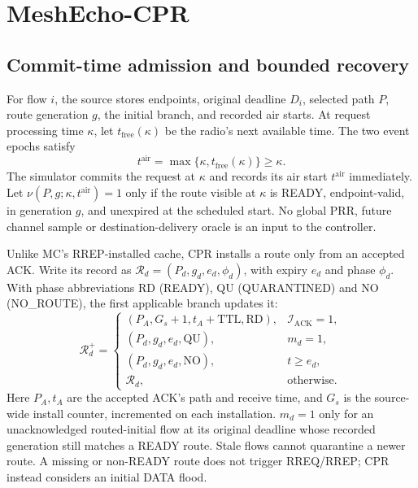 \documentclass[conference,letterpaper,10pt]{IEEEtran}
\begin{document}
\section{MeshEcho-CPR}
\label{sec:cpr}
\subsection{Commit-time admission and bounded recovery}
For flow $i$, the source stores endpoints, original deadline $D_i$, selected
path $P$, route generation $g$, the initial branch, and recorded air starts.
At request processing time $\kappa$, let $t_{\mathrm{free}}(\kappa)$ be the
radio's next available time. The two event epochs satisfy
\begin{equation}
t^{\mathrm{air}}=\max\{\kappa,t_{\mathrm{free}}(\kappa)\}\geq\kappa.
\label{eq:cpr-epochs}
\end{equation}
The simulator commits the request at $\kappa$ and records its air start
$t^{\mathrm{air}}$ immediately. Let $\nu(P,g;\kappa,t^{\mathrm{air}})=1$
only if the route visible at $\kappa$ is READY, endpoint-valid, in generation
$g$, and unexpired at the scheduled start. No global PRR, future channel
sample or destination-delivery oracle is an input to the controller.

Unlike MC's RREP-installed cache, CPR installs a route only from an accepted
ACK. Write its record as $\mathcal R_d=(P_d,g_d,e_d,\phi_d)$, with expiry
$e_d$ and phase $\phi_d$. With phase abbreviations RD (READY), QU
(QUARANTINED) and NO (NO\_ROUTE), the first applicable branch updates it:
\begin{equation}
\mathcal R_d^+=
\begin{cases}
(P_A,G_s+1,t_A+\mathrm{TTL},\mathrm{RD}),&\mathcal I_{\mathrm{ACK}}=1,\\
(P_d,g_d,e_d,\mathrm{QU}),&m_d=1,\\
(P_d,g_d,e_d,\mathrm{NO}),&t\geq e_d,\\
\mathcal R_d,&\text{otherwise}.
\end{cases}
\label{eq:cpr-route-lifecycle}
\end{equation}
Here $P_A,t_A$ are the accepted ACK's path and receive time, and $G_s$ is
the source-wide install counter, incremented on each installation.
$m_d=1$ only for an unacknowledged routed-initial flow at its original
deadline whose recorded generation still matches a READY route.
Stale flows cannot quarantine a newer route. A missing or non-READY route
does not trigger RREQ/RREP; CPR instead considers an initial DATA flood.
\end{document}
